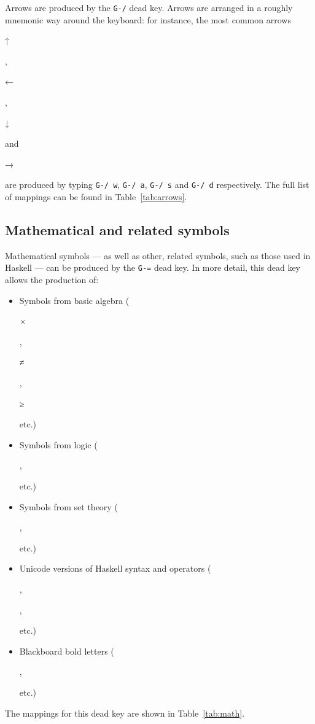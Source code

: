 \documentclass[oneside]{memoir}
\newcommand{\key}{\verb}
\newcommand{\out}[1]{\colorbox{gray!20}{\strut{}#1}}
\begin{document}
Arrows are produced by the \key|G-/| dead key.
Arrows are arranged in a roughly mnemonic way around the keyboard:
  for instance, the most common arrows \out{↑}, \out{←}, \out{↓} and~\out{→}
  are produced by typing \key|G-/ w|, \key|G-/ a|, \key|G-/ s| and \key|G-/ d| respectively.
The full list of mappings can be found in Table~\ref{tab:arrows}.

\subsection{Mathematical and related symbols}
\label{sec:mathematical_and_related_symbols}

Mathematical symbols --- as well as other, related symbols, such as those used in Haskell --- can be produced by the \key|G-=| dead key.
In more detail, this dead key allows the production of:
\begin{itemize}[noitemsep]
\item Symbols from basic algebra (\out{×}, \out{≠}, \out{≥} etc.)
\item Symbols from logic (\out{}, \out{} etc.)
\item Symbols from set theory (\out{}, \out{} etc.)
\item Unicode versions of Haskell syntax and operators (\out{}, \out{}, \out{} etc.)
\item Blackboard bold letters (\out{}, \out{} etc.)
\end{itemize}
The mappings for this dead key are shown in Table~\ref{tab:math}.
\end{document}
